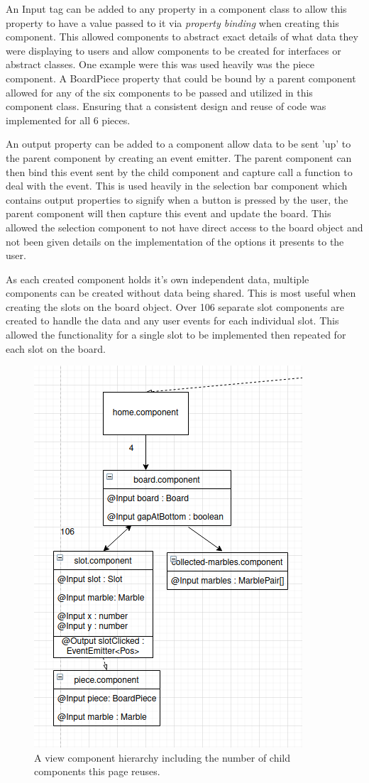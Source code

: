 \documentclass{l4proj}
\begin{document}
An Input tag can be added to any property in a component class to allow this property to have a value passed to it via \emph{property binding} when creating this component. This allowed components to abstract exact details of what data they were displaying to users and allow components to be created for interfaces or abstract classes. One example were this was used heavily was the piece component. A BoardPiece property that could be bound by a parent component allowed for any of the six components to be passed and utilized in this component class. Ensuring that a consistent design and reuse of code was implemented for all 6 pieces. 

An output property can be added to a component allow data to be sent 'up' to the parent component by creating an event emitter. The parent component can then bind this event sent by the child component and capture call a function to deal with the event. This is used heavily in the selection bar component which contains output properties to signify when a button is pressed by the user, the parent component will then capture this event and update the board. This allowed the selection component to not have direct access to the board object and not been given details on the implementation of the options it presents to the user. 

As each created component holds it's own independent data, multiple components can be created without data being shared. This is most useful when creating the slots on the board object. Over 106 separate slot components are created to handle the data and any user events for each individual slot. This allowed the functionality for a single slot to be implemented then repeated for each slot on the board.

\begin{figure}
    \centering
    \includegraphics[width=0.7\linewidth]{images/homeComponent.png}
    \caption{A view component hierarchy including the number of child components this page reuses.}
    \label{fig:homeComponent}
\end{figure}
\end{document}
